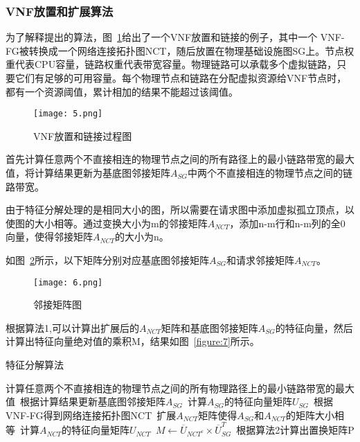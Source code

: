 \subsubsection{VNF放置和扩展算法}
为了解释提出的算法，图~\ref{figure:5}给出了一个VNF放置和链接的例子，其中一个 VNF-FG被转换成一个网络连接拓扑图NCT，随后放置在物理基础设施图SG上。节点权重代表CPU容量，链路权重代表带宽容量。物理链路可以承载多个虚拟链路，只要它们有足够的可用容量。每个物理节点和链路在分配虚拟资源给VNF节点时，都有一个资源阈值，累计相加的结果不能超过该阈值。\par
\begin{figure}[H]
    \centering
    
    \texttt{[image: 5.png]}
    \caption{VNF放置和链接过程图}
    \label{figure:5}
\end{figure}
首先计算任意两个不直接相连的物理节点之间的所有路径上的最小链路带宽的最大值，将计算结果更新为基底图邻接矩阵$A_{SG}$中两个不直接相连的物理节点之间的链路带宽。\par
由于特征分解处理的是相同大小的图，所以需要在请求图中添加虚拟孤立顶点，以使图的大小相等。通过变换大小为m的邻接矩阵$A_{NCT}$，添加n-m行和n-m列的全0向量，使得邻接矩阵$A_{NCT}$的大小为n。\par
如图~\ref{figure:6}所示，以下矩阵分别对应基底图邻接矩阵$A_{SG}$和请求邻接矩阵$A_{NCT}$。\par
\begin{figure}[H]
    \centering
    \texttt{[image: 6.png]}
    \caption{邻接矩阵图}
    \label{figure:6}
\end{figure}
根据算法1,可以计算出扩展后的$A_{NCT}$矩阵和基底图邻接矩阵$A_{SG}$的特征向量，然后计算出特征向量绝对值的乘积M，结果如图~\ref{figure:7}所示。\par

\begin{algorithm}[H]
    \caption{特征分解算法}
    \begin{algorithmic}[1]
        \STATE 计算任意两个不直接相连的物理节点之间的所有物理路径上的最小链路带宽的最大值\
        \STATE 根据计算结果更新基底图邻接矩阵$A_{SG}$\
        \STATE 计算$A_{SG}$的特征向量矩阵$U_{SG}$\
        \STATE 根据VNF-FG得到网络连接拓扑图NCT\
        \STATE 扩展$A_{NCT}$矩阵使得$A_{SG}$和$A_{NCT}$的矩阵大小相等\
        \STATE 计算$A_{NCT}$的特征向量矩阵$U_{NCT}$\
        \STATE $M\leftarrow \overline{U}_{NCT^c}\times \overline{U}_{SG}^T$\
        \STATE 根据算法2计算出置换矩阵P
    \end{algorithmic}
\end{algorithm}

